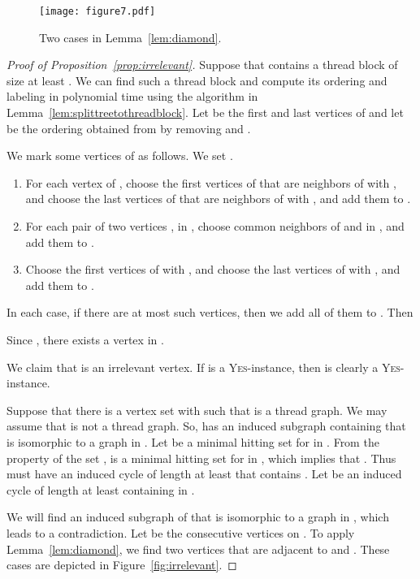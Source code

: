 \documentclass[11pt]{article}
\theoremstyle{remark}
\newcommand{\YES}{\textsc{Yes}}
\begin{document}
\begin{figure}
\centerline{\texttt{[image: figure7.pdf]}}
\caption{Two cases in Lemma~\ref{lem:diamond}.  }\label{fig:lemma65}
\end{figure}



\begin{proof}[Proof of Proposition~\ref{prop:irrelevant}]
Suppose that  contains a thread block of size at least .
We can find such a thread block  and compute its ordering  and labeling  in polynomial time using the algorithm in Lemma~\ref{lem:splittreetothreadblock}.
Let  be the first and last vertices of  and let  be the ordering obtained from  by removing  and .

We mark some vertices of  as follows. We set . 
\begin{enumerate}[(1)]
\item For each vertex  of , choose the first  vertices  of  that are neighbors of  with , and choose the last  vertices  of  that are neighbors of  with , and add them to . 
\item For each pair of two vertices ,  in , choose  common neighbors of  and  in , and add them to . 
\item  Choose the first  vertices  of  with , and choose the last  vertices  of  with , and add them to .
\end{enumerate}
In each case, if there are at most  such vertices, then we add all of them to .
Then

Since , 
there exists a vertex  in .


We claim that  is an irrelevant vertex. 
 If  is a \YES-instance, then  is clearly a \YES-instance.

Suppose that there is a vertex set  with  such that  is a thread graph.
We may assume that  is not a thread graph.
So,  has an induced subgraph containing  that is isomorphic to a graph in . 
Let  be a minimal hitting set for  in .
From the property of the set ,  is a minimal hitting set for  in , which implies that .
Thus  must have an induced cycle of length at least  that contains .
Let  be an induced cycle of length at least  containing  in .

We will find an induced subgraph of  that is isomorphic to a graph in , which leads to a contradiction.
Let  be the consecutive vertices on .
To apply Lemma~\ref{lem:diamond}, we find two vertices that are adjacent to  and .
These cases are depicted in Figure~\ref{fig:irrelevant}.




\end{proof}
\end{document}

